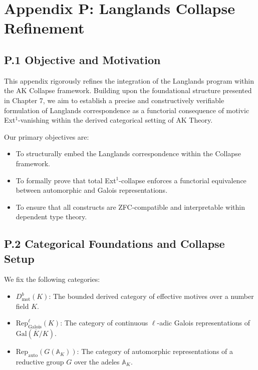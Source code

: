 \documentclass[11pt]{article}
\begin{document}

\section*{Appendix P: Langlands Collapse Refinement}

\subsection*{P.1 Objective and Motivation}

This appendix rigorously refines the integration of the Langlands program within the AK Collapse framework. Building upon the foundational structure presented in Chapter 7, we aim to establish a precise and constructively verifiable formulation of Langlands correspondence as a functorial consequence of motivic Ext$^1$-vanishing within the derived categorical setting of AK Theory.

Our primary objectives are:
\begin{itemize}
  \item To structurally embed the Langlands correspondence within the Collapse framework.
  \item To formally prove that total Ext$^1$-collapse enforces a functorial equivalence between automorphic and Galois representations.
  \item To ensure that all constructs are ZFC-compatible and interpretable within dependent type theory.
\end{itemize}

\subsection*{P.2 Categorical Foundations and Collapse Setup}

We fix the following categories:
\begin{itemize}
  \item $D^b_{\mathrm{mot}}(K)$: The bounded derived category of effective motives over a number field $K$.
  \item $\mathrm{Rep}^\ell_{\mathrm{Galois}}(K)$: The category of continuous $\ell$-adic Galois representations of $\mathrm{Gal}(\overline{K}/K)$.
  \item $\mathrm{Rep}_{\mathrm{auto}}(G(\mathbb{A}_K))$: The category of automorphic representations of a reductive group $G$ over the adeles $\mathbb{A}_K$.
\end{itemize}
\end{document}
